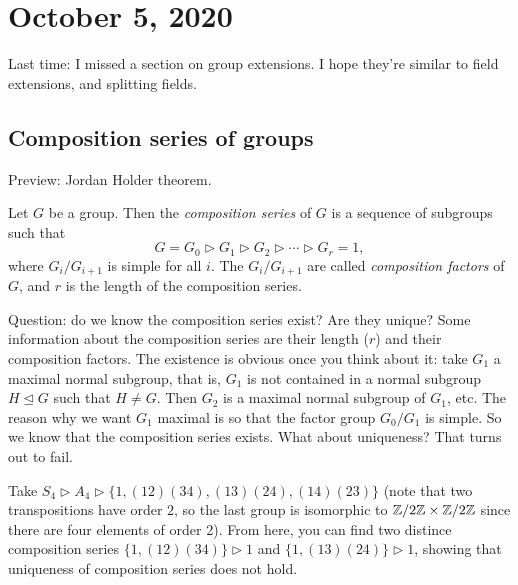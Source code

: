 \section{October 5, 2020}
Last time: I missed a section on group extensions. I hope they're similar to field extensions, and splitting fields.
\subsection{Composition series of groups}
Preview: Jordan Holder theorem. 
\begin{definition}
   Let $G$ be a group. Then the \emph{composition series} of $G$ is a sequence of subgroups such that \[
   G=G_0 \triangleright G_1 \triangleright G_2 \triangleright\cdots \triangleright G_r=1,
   \] where $G_i /G_{i+1}$ is simple for all $i$. The $G_i /G_{i+1}$ are called \emph{composition factors} of $G$, and $r$ is the length of the composition series.
\end{definition}
Question: do we know the composition series exist? Are they unique? Some information about the composition series are their length ($r$) and their composition factors. The existence is obvious once you think about it: take $G_1$ a maximal normal subgroup, that is, $G_1$ is not contained in a normal subgroup $H \trianglelefteq G$ such that $H\neq G$. Then $G_2$ is a maximal normal subgroup of $G_1$, etc. The reason why we want $G_1$ maximal is so that the factor group $G_0 /G_1$ is simple. So we know that the composition series exists. What about uniqueness? That turns out to fail.
\begin{example}
    Take $S_4 \triangleright A_4 \triangleright \{1,(12)(34),(13)(24),(14)(23)\} $ (note that two transpositions have order $2$, so the last group is isomorphic to $\mathbb{Z} /2\mathbb{Z}\times \mathbb{Z} /2\mathbb{Z}$ since there are four elements of order 2). From here, you can find two distince composition series $\{1,(12)(34)\} \triangleright 1$ and $\{1,(13)(24)\} \triangleright 1$, showing that uniqueness of composition series does not hold.
\end{example}

